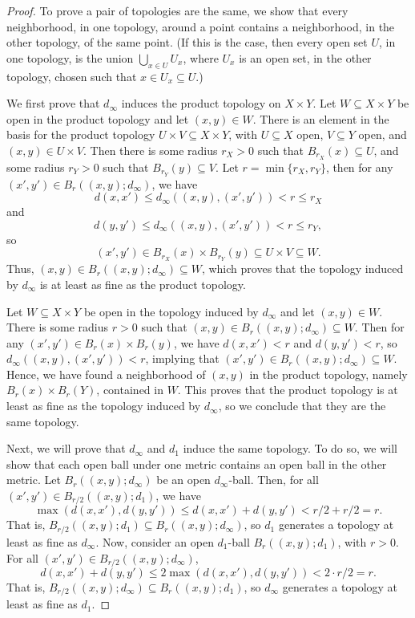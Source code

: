 \documentclass[12pt]{article}
\theoremstyle{definition}
\newcommand{\<}{\langle}
\renewcommand{\>}{\rangle}
\begin{document}
\begin{proof}
    To prove a pair of topologies are the same, we show that every neighborhood, in one topology, around a point contains a neighborhood, in the other topology, of the same point. (If this is the case, then every open set $U$, in one topology, is the union $\bigcup_{x \in U} U_x$, where $U_x$ is an open set, in the other topology, chosen such that $x \in U_x \subseteq U$.)

    We first prove that $d_\infty$ induces the product topology on $X \times Y$. Let $W \subseteq X \times Y$ be open in the product topology and let $(x, y) \in W$. There is an element in the basis for the product topology $U \times V \subseteq X \times Y$, with $U \subseteq X$ open, $V \subseteq Y$ open, and $(x, y) \in U \times V$. Then there is some radius $r_X > 0$ such that $B_{r_X}(x) \subseteq U$, and some radius $r_Y > 0$ such that $B_{r_Y}(y) \subseteq V$. Let $r = \min\{r_X, r_Y\}$, then for any $(x', y') \in B_r((x, y); d_\infty)$, we have
    \[
        d(x, x') \leq d_\infty((x, y), (x', y')) < r \leq r_X
    \]
    and
    \[
        d(y, y') \leq d_\infty((x, y), (x', y')) < r \leq r_Y,
    \]
    so
    \[
        (x', y') \in B_{r_X}(x) \times B_{r_Y}(y) \subseteq U \times V \subseteq W.
    \]
    Thus, $(x, y) \in B_r((x, y); d_\infty) \subseteq W$, which proves that the topology induced by $d_\infty$ is at least as fine as the product topology.

    Let $W \subseteq X \times Y$ be open in the topology induced by $d_\infty$ and let $(x, y) \in W$. There is some radius $r > 0$ such that $(x, y) \in B_r((x, y); d_\infty) \subseteq W$. Then for any $(x', y') \in B_r(x) \times B_r(y)$, we have $d(x, x') < r$ and $d(y, y') < r$, so $d_\infty((x, y), (x', y')) < r$, implying that $(x', y') \in B_r((x, y); d_\infty) \subseteq W$. Hence, we have found a neighborhood of $(x, y)$ in the product topology, namely $B_r(x) \times B_r(Y)$, contained in $W$. This proves that the product topology is at least as fine as the topology induced by $d_\infty$, so we conclude that they are the same topology.

    Next, we will prove that $d_\infty$ and $d_1$ induce the same topology. To do so, we will show that each open ball under one metric contains an open ball in the other metric. Let $B_r((x, y); d_\infty)$ be an open $d_\infty$-ball. Then, for all $(x', y') \in B_{r/2}((x, y); d_1)$, we have
    \[
        \max(d(x, x'), d(y, y'))
            \leq  d(x,x') + d(y,y')
            < r/2 + r/2
            = r.
    \]
    That is, $B_{r/2}((x, y); d_1) \subseteq B_r((x, y); d_\infty)$, so $d_1$ generates a topology at least as fine as $d_\infty$. Now, consider an open $d_1$-ball $B_r((x, y); d_1)$, with $r > 0$. For all $(x', y') \in B_{r/2}((x, y); d_\infty)$,
    \[
        d(x,x') + d(y,y')
            \leq 2\max(d(x, x'), d(y, y'))
            < 2 \cdot r/2
            = r.
    \]
    That is, $B_{r/2}((x, y); d_\infty) \subseteq B_r((x, y); d_1)$, so $d_\infty$ generates a topology at least as fine as $d_1$.

\end{proof}
\end{document}

